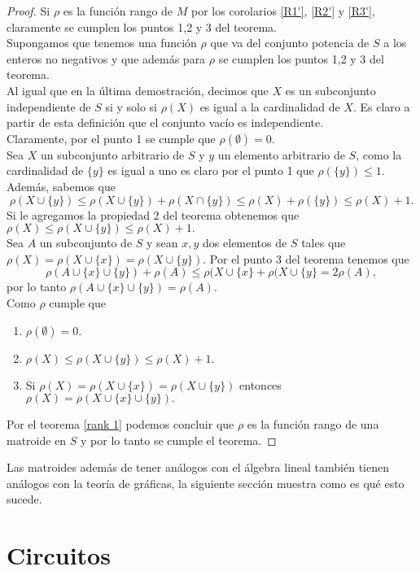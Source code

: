 \begin{proof}
Si $\rho $ es la función rango de $M$ por los corolarios \ref{R1'}, \ref{R2'} y \ref{R3'}, claramente se cumplen los puntos 1,2 y 3 del teorema. \\
Supongamos que tenemos una función $\rho$ que va del conjunto potencia de $S$ a los enteros no negativos y que además para $\rho$ se cumplen los puntos 1,2 y 3 del teorema. \\
Al igual que en la última demostración, decimos que $X$ es un subconjunto independiente de $S$ si y solo si $\rho(X)$ es igual a la cardinalidad de $X$. Es claro a partir de esta definición que el conjunto vacío es independiente. \\
Claramente, por el punto 1 se cumple que $\rho(\emptyset) =0.$\\
Sea $X$ un subconjunto arbitrario de $S$ y $y$ un elemento arbitrario de $S$, como la cardinalidad de $\{y\}$ es igual a uno es claro por el punto 1 que $\rho(\{y\})\leq 1$. Además, sabemos que 
$$\rho(X \cup \{y\}) \leq \rho(X \cup \{y\}) + \rho(X \cap \{y\}) \leq \rho(X) + \rho(\{y\}) \leq \rho(X) +1. $$
Si le agregamos la propiedad 2 del teorema obtenemos que $\rho(X) \leq \rho(X \cup \{y\}) \leq \rho(X)+1.$ \\
Sea $A$ un subconjunto de $S$ y sean $x,y$ dos elementos de $S$ tales que $\rho(X)=\rho(X \cup \{ x\}) =\rho(X \cup \{ y\}) .$ Por el punto 3 del teorema tenemos que 
$$\rho(A \cup \{x\} \cup \{y\}) + \rho(A) \leq \rho(X \cup \{ x\} + \rho(X \cup \{ y\} = 2 \rho(A),$$
por lo tanto $\rho(A \cup \{x\} \cup \{y\}) = \rho(A)$. \\
Como $\rho$ cumple que 
\begin{enumerate}
\item $\rho(\emptyset) =0.$
\item $\rho(X) \leq \rho(X \cup \{y\}) \leq \rho(X)+1.$
\item Si $\rho(X)=\rho(X \cup \{ x\}) =\rho(X \cup \{ y\}) $ entonces $\rho(X)=\rho(X \cup \{ x\} \cup \{ y\}).$
\end{enumerate}
Por el teorema \ref{rank 1} podemos concluir que $\rho$ es la función rango de una matroide en $S$ y por lo tanto se cumple el teorema. 
\end{proof}

Las matroides además de tener análogos con el álgebra lineal también tienen análogos con la teoría de gráficas, la siguiente sección muestra como es qué esto sucede. 

\section{Circuitos}

